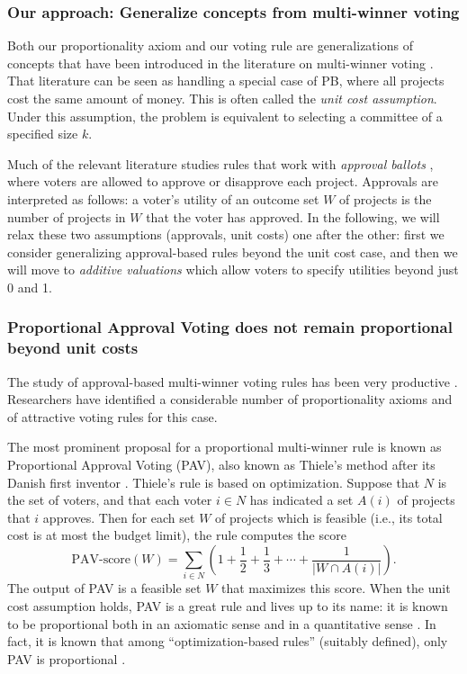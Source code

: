 \documentclass[10pt]{scrartcl}
\theoremstyle{definition}
\theoremstyle{plain}
\begin{document}
\subsubsection*{Our approach: Generalize concepts from multi-winner voting}
Both our proportionality axiom and our voting rule are generalizations of concepts that have been introduced in the literature on multi-winner voting \citep{FSST-trends}. That literature can be seen as handling a special case of PB, where all projects cost the same amount of money. This is often called the \emph{unit cost assumption}. Under this assumption, the problem is equivalent to selecting a committee of a specified size $k$. 

Much of the relevant literature studies rules that work with \emph{approval ballots} \citep{lackner2022book}, where voters are allowed to approve or disapprove each project. Approvals are interpreted as follows: a voter's utility of an outcome set $W$ of projects is the number of projects in $W$ that the voter has approved.
In the following, we will relax these two assumptions (approvals, unit costs) one after the other: first we consider generalizing approval-based rules beyond the unit cost case, and then we will move to \emph{additive valuations} which allow voters to specify utilities beyond just 0 and 1.

\subsubsection*{Proportional Approval Voting does not remain proportional beyond unit costs}

The study of approval-based multi-winner voting rules has been very productive \citep{justifiedRepresentation,aaai/BrillFJL17-phragmen,pjr17,lac-sko:t:approval-thiele,pet-sko:laminar}. Researchers have identified a considerable number of proportionality axioms and of attractive voting rules for this case. 

The most prominent proposal for a proportional multi-winner rule is known as Proportional Approval Voting (PAV), also known as Thiele's method after its Danish first inventor \citet{Thie95a}. Thiele's rule is based on optimization. Suppose that $N$ is the set of voters, and that each voter $i\in N$ has indicated a set $A(i)$ of projects that $i$ approves. Then for each set $W$ of projects which is feasible (i.e., its total cost is at most the budget limit), the rule computes the score
\[ \text{PAV-score}(W) = \sum_{i\in N} \left(1 + \frac12 + \frac13 + \cdots + \frac{1}{|W \cap A(i)|} \right) \text{.} \]
The output of PAV is a feasible set $W$ that maximizes this score. When the unit cost assumption holds, PAV is a great rule and lives up to its name: it is known to be proportional both in an axiomatic sense \citep{justifiedRepresentation} and in a quantitative sense \citep{skowron:prop-degree}. In fact, it is known that among ``optimization-based rules'' (suitably defined), only PAV is proportional \citep{lac-sko:t:approval-thiele,justifiedRepresentation}.
\end{document}

